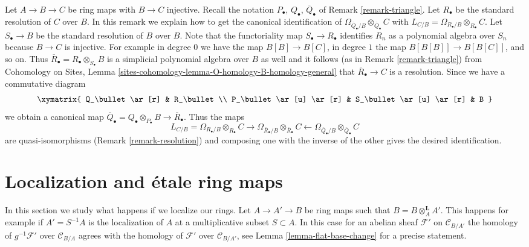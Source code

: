 \begin{remark}
\label{remark-explicit-map}
Let $A \to B \to C$ be ring maps with $B \to C$ injective.
Recall the notation $P_\bullet$, $Q_\bullet$, $\overline{Q}_\bullet$ of
Remark \ref{remark-triangle}.
Let $R_\bullet$ be the standard resolution of $C$ over $B$.
In this remark we explain how to get the canonical identification
of $\Omega_{\overline{Q}_\bullet/B} \otimes_{\overline{Q}_\bullet} C$
with $L_{C/B} = \Omega_{R_\bullet/B} \otimes_{R_\bullet} C$.
Let $S_\bullet \to B$ be the standard resolution of $B$ over $B$.
Note that the functoriality map $S_\bullet \to R_\bullet$ identifies
$R_n$ as a polynomial algebra over $S_n$ because $B \to C$ is injective.
For example in degree $0$ we have the map $B[B] \to B[C]$, in degree
$1$ the map $B[B[B]] \to B[B[C]]$, and so on. Thus
$\overline{R}_\bullet = R_\bullet \otimes_{S_\bullet} B$
is a simplicial polynomial algebra
over $B$ as well and it follows (as in Remark \ref{remark-triangle}) from
Cohomology on Sites, Lemma
\ref{sites-cohomology-lemma-O-homology-B-homology-general}
that $\overline{R}_\bullet \to C$ is a resolution. Since we have
a commutative diagram
$$
\xymatrix{
Q_\bullet \ar[r] & R_\bullet \\
P_\bullet \ar[u] \ar[r] & S_\bullet \ar[u] \ar[r] & B
}
$$
we obtain a canonical map
$\overline{Q}_\bullet = Q_\bullet \otimes_{P_\bullet} B \to
\overline{R}_\bullet$. Thus the maps
$$
L_{C/B} = \Omega_{R_\bullet/B} \otimes_{R_\bullet} C
\longrightarrow
\Omega_{\overline{R}_\bullet/B} \otimes_{\overline{R}_\bullet} C
\longleftarrow
\Omega_{\overline{Q}_\bullet/B} \otimes_{\overline{Q}_\bullet} C
$$
are quasi-isomorphisms (Remark \ref{remark-resolution}) and composing
one with the inverse of the other gives the desired identification.
\end{remark}





\section{Localization and \'etale ring maps}
\label{section-localization}

\noindent
In this section we study what happens if we localize our rings.
Let $A \to A' \to B$ be ring maps such that $B = B \otimes_A^\mathbf{L} A'$.
This happens for example if $A' = S^{-1}A$ is the localization of $A$
at a multiplicative subset $S \subset A$. In this
case for an abelian sheaf $\mathcal{F}'$ on $\mathcal{C}_{B/A'}$
the homology of $g^{-1}\mathcal{F}'$ over $\mathcal{C}_{B/A}$ agrees with
the homology of $\mathcal{F}'$ over $\mathcal{C}_{B/A'}$, see
Lemma \ref{lemma-flat-base-change} for a precise statement.

